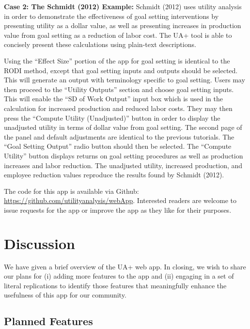 \documentclass[
  english,
  man]{apa6}
\begin{document}
\textbf{Case 2: The Schmidt (2012) Example:} Schmidt (2012) uses utility analysis in order to demonstrate the effectiveness of goal setting interventions by presenting utility as a dollar value, as well as presenting increases in production value from goal setting as a reduction of labor cost. The UA+ tool is able to concisely present these calculations using plain-text descriptions.

Using the ``Effect Size'' portion of the app for goal setting is identical to the RODI method, except that goal setting inputs and outputs should be selected. This will generate an output with terminology specific to goal setting. Users may then proceed to the ``Utility Outputs'' section and choose goal setting inputs. This will enable the ``SD of Work Output'' input box which is used in the calculation for increased production and reduced labor costs. They may then press the ``Compute Utility (Unadjusted)'' button in order to display the unadjusted utility in terms of dollar value from goal setting. The second page of the panel and default adjustments are identical to the previous tutorials. The ``Goal Setting Output'' radio button should then be selected. The ``Compute Utility'' button displays returns on goal setting procedures as well as production increases and labor reduction. The unadjusted utility, increased production, and employee reduction values reproduce the results found by Schmidt (2012).

The code for this app is available via Github: \url{https://github.com/utilityanalysis/webApp}. Interested readers are welcome to issue requests for the app or improve the app as they like for their purposes.

\section{Discussion}\label{discussion}

We have given a brief overview of the UA+ web app. In closing, we wish to share our plans for (i) adding more features to the app and (ii) engaging in a set of literal replications to identify those features that meaningfully enhance the usefulness of this app for our community.

\subsection{Planned Features}\label{planned-features}
\end{document}
